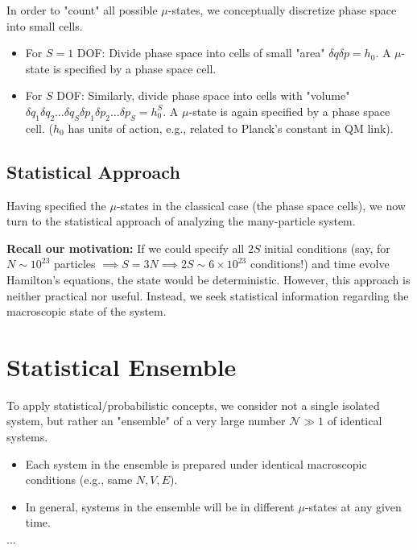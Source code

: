 \documentclass[11pt]{article}
\begin{document}
In order to "count" all possible $\mu$-states, we conceptually discretize phase space into small cells.
\begin{itemize}
    \item For $S=1$ DOF: Divide phase space into cells of small "area" $\delta q \delta p = h_0$. A $\mu$-state is specified by a phase space cell.
    \item For $S$ DOF: Similarly, divide phase space into cells with "volume" $\delta q_1 \delta q_2 \dots \delta q_S \delta p_1 \delta p_2 \dots \delta p_S = h_0^S$. A $\mu$-state is again specified by a phase space cell. ($h_0$ has units of action, e.g., related to Planck's constant in QM link).
\end{itemize}


\subsection*{Statistical Approach}

Having specified the $\mu$-states in the classical case (the phase space cells), we now turn to the statistical approach of analyzing the many-particle system.

\textbf{Recall our motivation:} If we could specify all $2S$ initial conditions (say, for $N \sim 10^{23}$ particles $\implies S=3N \implies 2S \sim 6 \times 10^{23}$ conditions!) and time evolve Hamilton's equations, the state would be deterministic. However, this approach is neither practical nor useful. Instead, we seek statistical information regarding the macroscopic state of the system.

\section*{Statistical Ensemble}

To apply statistical/probabilistic concepts, we consider not a single isolated system, but rather an "ensemble" of a very large number $\mathcal{N} \gg 1$ of identical systems.
\begin{itemize}
    \item Each system in the ensemble is prepared under identical macroscopic conditions (e.g., same $N, V, E$).
    \item In general, systems in the ensemble will be in different $\mu$-states at any given time.
\end{itemize}

\begin{center}
 \quad
{} \quad $\dots$ \quad
{}
\end{center}
\end{document}
